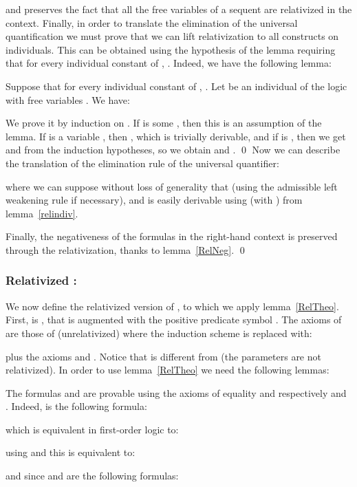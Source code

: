 \documentclass{CSML}
\begin{document}
and preserves the fact that all the free variables of a sequent are relativized in the context. Finally, in order to translate the elimination of the universal quantification we must prove that we can lift relativization to all constructs on individuals. This can be obtained using the hypothesis of the lemma requiring that for every individual constant  of , . Indeed, we have the following lemma:
\begin{lem}
\label{relindiv}
Suppose that for every individual constant  of , . Let  be an individual of the logic with free variables . We have:

\end{lem}
\proof
We prove it by induction on . If  is some , then this is an assumption of the lemma. If  is a variable , then , which is trivially derivable, and if  is , then we get  and  from the induction hypotheses, so we obtain  and .
\qed
Now we can describe the translation of the elimination rule of the universal quantifier:

where we can suppose without loss of generality that  (using the admissible left weakening rule if necessary), and  is easily derivable using  (with ) from lemma~\ref{relindiv}.\par
Finally, the negativeness of the formulas in the right-hand context is preserved through the relativization, thanks to lemma~\ref{RelNeg}.
\qed
\subsubsection{Relativized \texorpdfstring{}{PAomega}: \texorpdfstring{}{PAomegar}}
We now define the relativized version  of , to which we apply lemma~\ref{RelTheo}. First,  is , that is  augmented with the positive predicate symbol . The axioms of  are those of  (unrelativized) where the induction scheme is replaced with:

plus the axioms  and . Notice that  is different from  (the parameters  are not relativized). In order to use lemma~\ref{RelTheo} we need the following lemmas:
\begin{lem}

\end{lem}
\proof
The formulas  and  are provable using the axioms of equality and respectively  and . Indeed,  is the following formula:

which is equivalent in first-order logic to:

using  and  this is equivalent to:

and since  and  are the following formulas:
\end{document}
